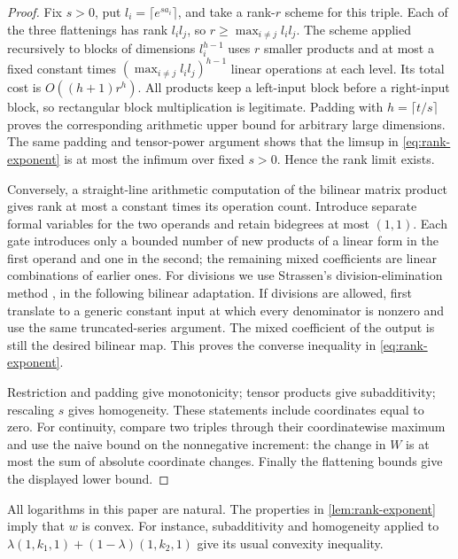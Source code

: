 \documentclass[11pt]{article}
\numberwithin{equation}{section}
\theoremstyle{definition}
\theoremstyle{remark}
\begin{document}
\begin{proof}
Fix \(s>0\), put \(l_i=\lceil e^{sa_i}\rceil\), and take a rank-\(r\)
scheme for this triple.  Each of the three flattenings has rank
\(l_i l_j\), so \(r\ge\max_{i\ne j}l_i l_j\).
The scheme applied recursively to blocks of dimensions \(l_i^{h-1}\)
uses \(r\) smaller products and at most a fixed constant times
\((\max_{i\ne j}l_i l_j)^{h-1}\) linear operations at each level.
Its total cost is \(O((h+1)r^h)\).
All products keep a left-input block before a right-input block, so
rectangular block multiplication is legitimate.
Padding with \(h=\lceil t/s\rceil\) proves the corresponding arithmetic
upper bound for arbitrary large dimensions.
The same padding and tensor-power argument shows that the limsup in
\eqref{eq:rank-exponent} is at most the infimum over fixed \(s>0\).
Hence the rank limit exists.

Conversely, a straight-line arithmetic computation of the bilinear
matrix product gives rank at most a constant times its operation count.
Introduce separate formal variables for the two operands and retain
bidegrees at most \((1,1)\).
Each gate introduces only a bounded number of new products of a linear
form in the first operand and one in the second; the remaining mixed
coefficients are linear combinations of earlier ones.
For divisions we use Strassen's division-elimination method
\cite{strassen-division}, in the following bilinear adaptation.
If divisions are allowed, first translate to a generic constant input
at which every denominator is nonzero and use the same truncated-series
argument.  The mixed coefficient of the output is still the desired
bilinear map.
This proves the converse inequality in \eqref{eq:rank-exponent}.

Restriction and padding give monotonicity; tensor products give
subadditivity; rescaling \(s\) gives homogeneity.
These statements include coordinates equal to zero.
For continuity, compare two triples through their coordinatewise
maximum and use the naive bound on the nonnegative increment:
the change in \(W\) is at most the sum of absolute coordinate changes.
Finally the flattening bounds give the displayed lower bound.
\end{proof}

All logarithms in this paper are natural.
The properties in \cref{lem:rank-exponent} imply that \(w\) is convex.
For instance, subadditivity and homogeneity applied to
\(\lambda(1,k_1,1)+(1-\lambda)(1,k_2,1)\) give its usual convexity
inequality.
\end{document}
